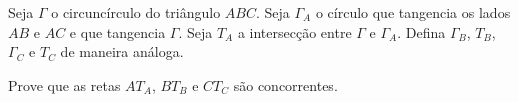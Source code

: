 Seja $\Gamma$ o circuncírculo do triângulo $ABC$. Seja $\Gamma_{A}$ o círculo que tangencia os lados $AB$ e $AC$ e que tangencia $\Gamma$. Seja $T_{A}$ a intersecção entre $\Gamma$ e $\Gamma_{A}$. Defina $\Gamma_B$, $T_B$, $\Gamma_C$ e $T_C$ de maneira análoga. 

Prove que as retas $AT_A$, $BT_B$ e $CT_C$ são concorrentes.
